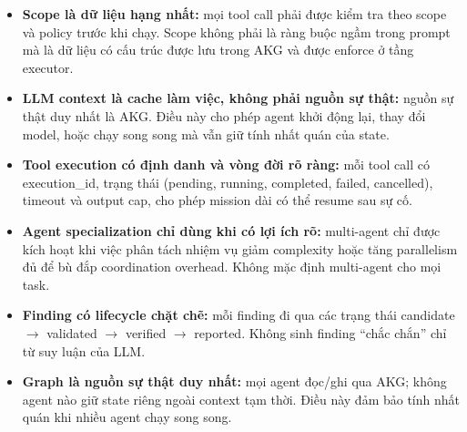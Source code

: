 \begin{itemize}
    \item \textbf{Scope là dữ liệu hạng nhất:} mọi tool call phải được kiểm tra theo scope và policy trước khi chạy. Scope không phải là ràng buộc ngầm trong prompt mà là dữ liệu có cấu trúc được lưu trong AKG và được enforce ở tầng executor.
    \item \textbf{LLM context là cache làm việc, không phải nguồn sự thật:} nguồn sự thật duy nhất là AKG. Điều này cho phép agent khởi động lại, thay đổi model, hoặc chạy song song mà vẫn giữ tính nhất quán của state.
    \item \textbf{Tool execution có định danh và vòng đời rõ ràng:} mỗi tool call có execution\_id, trạng thái (pending, running, completed, failed, cancelled), timeout và output cap, cho phép mission dài có thể resume sau sự cố.
    \item \textbf{Agent specialization chỉ dùng khi có lợi ích rõ:} multi-agent chỉ được kích hoạt khi việc phân tách nhiệm vụ giảm complexity hoặc tăng parallelism đủ để bù đắp coordination overhead. Không mặc định multi-agent cho mọi task.
    \item \textbf{Finding có lifecycle chặt chẽ:} mỗi finding đi qua các trạng thái candidate $\rightarrow$ validated $\rightarrow$ verified $\rightarrow$ reported. Không sinh finding ``chắc chắn'' chỉ từ suy luận của LLM.
    \item \textbf{Graph là nguồn sự thật duy nhất:} mọi agent đọc/ghi qua AKG; không agent nào giữ state riêng ngoài context tạm thời. Điều này đảm bảo tính nhất quán khi nhiều agent chạy song song.
\end{itemize}

